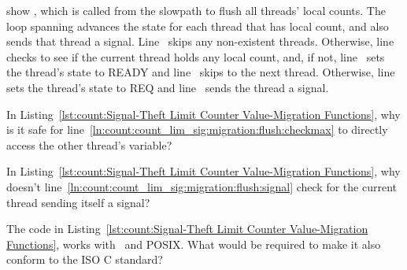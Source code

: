\begin{lineref}
 show , which is called from the
slowpath to flush all threads' local counts.
The loop spanning
 advances the  state for each
thread that has local count, and also sends that thread a signal.
Line~ skips any non-existent threads.
Otherwise, line~ checks to see if the current thread holds any local
count, and, if not, line~ sets the thread's  state to READY
and line~ skips to the next thread.
Otherwise, line~ sets the thread's  state to REQ and
line~ sends the thread a signal.
\end{lineref}

\QuickQuiz{}
	In Listing~\ref{lst:count:Signal-Theft Limit Counter Value-Migration Functions},
	why is it safe for
        line~\ref{ln:count:count_lim_sig:migration:flush:checkmax}
        to directly access the other thread's
	 variable?
 \QuickQuizEnd

\QuickQuiz{}
	In Listing~\ref{lst:count:Signal-Theft Limit Counter Value-Migration Functions},
	why doesn't
        line~\ref{ln:count:count_lim_sig:migration:flush:signal}
        check for the current thread sending itself
	a signal?
 \QuickQuizEnd

\QuickQuiz{}
	The code in
	Listing~\ref{lst:count:Signal-Theft Limit Counter Value-Migration Functions},
	works with \GCC\ and POSIX.
	What would be required to make it also conform to the ISO C standard?
 \QuickQuizEnd

